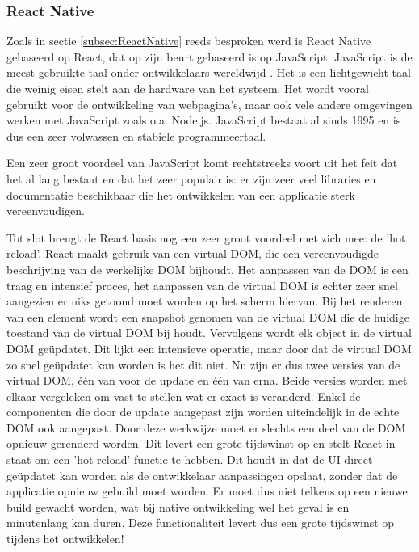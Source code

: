 \subsubsection{React Native}
\label{subsubsec:taalReactNative}

Zoals in sectie \ref{subsec:ReactNative} reeds besproken werd is React Native gebaseerd op React, dat op zijn beurt gebaseerd is op JavaScript. JavaScript is de meest gebruikte taal onder ontwikkelaars wereldwijd \autocite{Liu2020a}. Het is een lichtgewicht taal die weinig eisen stelt aan de hardware van het systeem. Het wordt vooral gebruikt voor de ontwikkeling van webpagina's, maar ook vele andere omgevingen werken met JavaScript zoals o.a. Node.js. JavaScript bestaat al sinds 1995 en is dus een zeer volwassen en stabiele programmeertaal.

Een zeer groot voordeel van JavaScript komt rechtstreeks voort uit het feit dat het al lang bestaat en dat het zeer populair is: er zijn zeer veel libraries en documentatie beschikbaar die het ontwikkelen van een applicatie sterk vereenvoudigen.

Tot slot brengt de React basis nog een zeer groot voordeel met zich mee: de 'hot reload'. React maakt gebruik van een virtual DOM, die een vereenvoudigde beschrijving van de werkelijke DOM bijhoudt. Het aanpassen van de DOM is een traag en intensief proces, het aanpassen van de virtual DOM is echter zeer snel aangezien er niks getoond moet worden op het scherm hiervan. Bij het renderen van een element wordt een snapshot genomen van de virtual DOM die de huidige toestand van de virtual DOM bij houdt. Vervolgens wordt elk object in de virtual DOM geüpdatet. Dit lijkt een intensieve operatie, maar door dat de virtual DOM zo snel geüpdatet kan worden is het dit niet. Nu zijn er dus twee versies van de virtual DOM, één van voor de update en één van erna. Beide versies worden met elkaar vergeleken om vast te stellen wat er exact is veranderd. Enkel de componenten die door de update aangepast zijn worden uiteindelijk in de echte DOM ook aangepast. Door deze werkwijze moet er slechts een deel van de DOM opnieuw gerenderd worden. Dit levert een grote tijdswinst op en stelt React in staat om een 'hot reload' functie te hebben. Dit houdt in dat de UI direct geüpdatet kan worden als de ontwikkelaar aanpassingen opslaat, zonder dat de applicatie opnieuw gebuild moet worden. Er moet dus niet telkens op een nieuwe build gewacht worden, wat bij native ontwikkeling wel het geval is en minutenlang kan duren. Deze functionaliteit levert dus een grote tijdswinst op tijdens het ontwikkelen!

